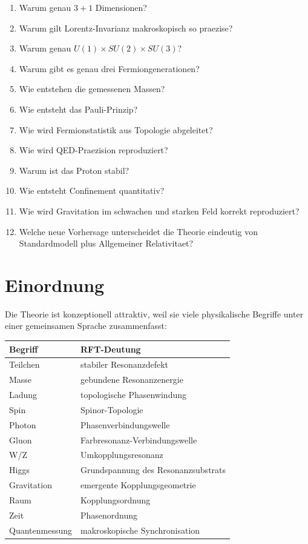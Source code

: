 \documentclass[11pt,a4paper]{article}
\begin{document}
\begin{enumerate}
  \item Warum genau $3+1$ Dimensionen?
  \item Warum gilt Lorentz-Invarianz makroskopisch so praezise?
  \item Warum genau $U(1)\times SU(2)\times SU(3)$?
  \item Warum gibt es genau drei Fermiongenerationen?
  \item Wie entstehen die gemessenen Massen?
  \item Wie entsteht das Pauli-Prinzip?
  \item Wie wird Fermionstatistik aus Topologie abgeleitet?
  \item Wie wird QED-Praezision reproduziert?
  \item Warum ist das Proton stabil?
  \item Wie entsteht Confinement quantitativ?
  \item Wie wird Gravitation im schwachen und starken Feld korrekt reproduziert?
  \item Welche neue Vorhersage unterscheidet die Theorie eindeutig von Standardmodell plus Allgemeiner Relativitaet?
\end{enumerate}

\section{Einordnung}

Die Theorie ist konzeptionell attraktiv, weil sie viele physikalische Begriffe unter einer gemeinsamen Sprache
zusammenfasst:

\begin{longtable}{>{\raggedright\arraybackslash}p{4cm}p{9cm}}
\toprule
Begriff & RFT-Deutung \\
\midrule
Teilchen & stabiler Resonanzdefekt \\
Masse & gebundene Resonanzenergie \\
Ladung & topologische Phasenwindung \\
Spin & Spinor-Topologie \\
Photon & Phasenverbindungswelle \\
Gluon & Farbresonanz-Verbindungswelle \\
W/Z & Umkopplungsresonanz \\
Higgs & Grundspannung des Resonanzsubstrats \\
Gravitation & emergente Kopplungsgeometrie \\
Raum & Kopplungsordnung \\
Zeit & Phasenordnung \\
Quantenmessung & makroskopische Synchronisation \\
\bottomrule
\end{longtable}
\end{document}
